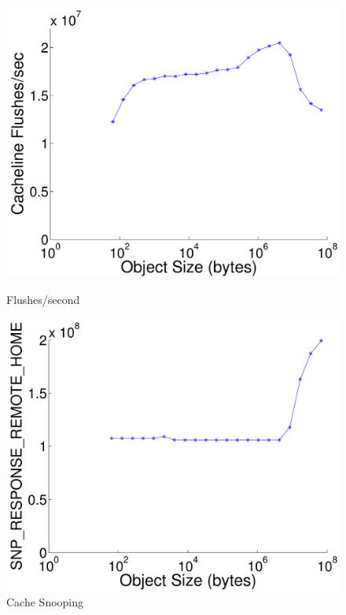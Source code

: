 \begin{figure}[t]
\begin{minipage}[b]{0.49\linewidth}
\includegraphics[width=\columnwidth]{figs/flushes_per_sec}
\caption{Flushes/second}
\label{fig:flushes_per_sec}
\end{minipage}
\begin{minipage}[b]{0.49\linewidth}
\includegraphics[width=\columnwidth]{figs/snoop_response}
\caption{Cache Snooping}
\label{fig:ext_snoop}
\end{minipage}
\end{figure}




